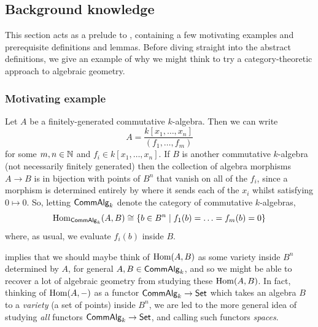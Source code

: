 
\subsection{Background knowledge} %
\label{sub:background_knowledge}

    This section acts as a prelude to \cite{Toen:2005wxa}, containing a few motivating examples and prerequisite definitions and lemmas.
    Before diving straight into the abstract definitions, we give an example of why we might think to try a category-theoretic approach to algebraic geometry.

    \subsubsection{Motivating example} %
    \label{ssub:motivating_example}

        Let $A$ be a finitely-generated commutative $k$-algebra.
        Then we can write
        \begin{equation*}
            A=\frac{k[x_1,\ldots,x_n]}{(f_1,\ldots,f_m)}
        \end{equation*}
        for some $m,n\in\mathbb{N}$ and $f_i\in k[x_1,\ldots,x_n]$.
        If $B$ is another commutative $k$-algebra (not necessarily finitely generated) then the collection of algebra morphisms $A\to B$ is in bijection with points of $B^n$ that vanish on all of the $f_i$, since a morphism is determined entirely by where it sends each of the $x_i$ whilst satisfying $0\mapsto0$.
        So, letting $\mathsf{CommAlg}_k$ denote the category of commutative $k$-algebras,
        \begin{equation}\label{eq:link-between-hom-and-varieties}
            \operatorname{Hom}_{\mathsf{CommAlg}_k}(A,B)\cong\{b\in B^n \mid f_1(b)=\ldots=f_m(b)=0\}
        \end{equation}
        where, as usual, we evaluate $f_i(b)$ inside $B$.

         implies that we should maybe think of $\operatorname{Hom}(A,B)$ as some variety inside $B^n$ determined by $A$, for general $A,B\in\mathsf{CommAlg}_k$, and so we might be able to recover a lot of algebraic geometry from studying these $\operatorname{Hom}(A,B)$.
        In fact, thinking of $\operatorname{Hom}(A,{-})$ as a functor $\mathsf{CommAlg}_k\to\mathsf{Set}$ which takes an algebra $B$ to a \emph{variety} (a set of points) inside $B^n$, we are led to the more general idea of studying \emph{all} functors $\mathsf{CommAlg}_k\to\mathsf{Set}$, and calling such functors \emph{spaces}.

